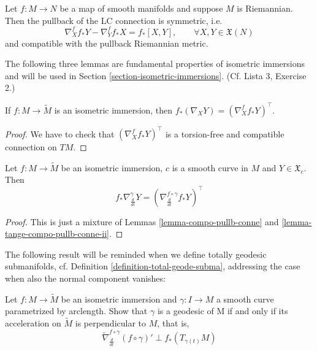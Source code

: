 \begin{proposition}
\label{proposition-symme-compa}
Let $f:M \to N$ be a map of smooth manifolds
and suppose $M$ is Riemannian.
Then the pullback of the LC connection is
symmetric, i.e.
\begin{equation}
\label{equation-pullb-conne-symme}
\nabla^f_X f_*Y-\nabla^f_Yf_*X =
f_*[X,Y],\qquad
\forall X,Y \in \mathfrak{X}(N)
\end{equation}
and compatible with the pullback Riemannian
metric.
\end{proposition}

The following three lemmas are fundamental
properties of isometric
immersions and will be used in Section
\ref{section-isometric-immersions}. (Cf.
Lista 3, Exercise 2.)

\begin{lemma}
\label{lemma-tange-compo-pullb-conne-ii}
If $f:M \to \tilde{M}$ is an isometric
immersion, then
$f_*(\nabla_XY)=(\nabla^f_Xf_*Y)^\top$.
\end{lemma}

\begin{proof}
We have to check that $(\nabla^f_Xf_*Y)^\top$
is a torsion-free and compatible
connection on $TM$.
\end{proof}

\begin{lemma}
\label{lemma-isometric-immersion-along-curve}
Let $f:M \to \tilde{M}$ be an isometric
immersion, $c$ is a smooth curve in $M$
and $Y\in\mathfrak{X}_c$. Then
$$
f_*\nabla_{\frac{d}{dt}}^\gamma Y
=\left(\nabla^{f\circ\gamma}_{\frac{d}{dt}}
f_*Y\right)^\top
$$
\end{lemma}

\begin{proof}
This is just a mixture of Lemmas
\ref{lemma-compo-pullb-conne}
 and \ref{lemma-tange-compo-pullb-conne-ii}.
\end{proof}

The following result will be reminded when we
define totally geodesic
submanifolds, cf. Definition
\ref{definition-total-geode-subma},
addressing the case when also the normal
component vanishes:

\begin{lemma}
\label{lemma-geodesics-of-submanifold}
Let $f:M \to \tilde{M}$ be an isometric
immersion and $\gamma:I\to M$ a smooth
curve parametrized by arclength. Show that
$\gamma$ is a geodesic of M
if and only if its acceleration on
$\tilde{M}$ is perpendicular to $M$, that is,
$$
\tilde{\nabla}^{f\circ\gamma}_{\frac{d}
{dt}}(f\circ\gamma)'\perp
f_*(T_{\gamma(t)}M)
$$
\end{lemma}

